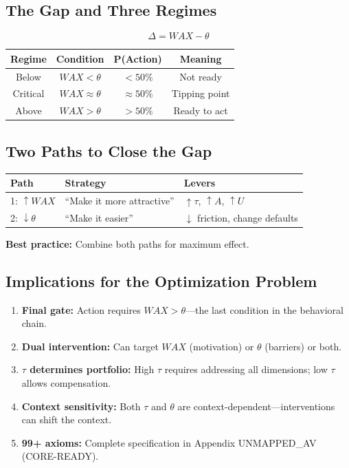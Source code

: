 \subsection{The Gap and Three Regimes}

\begin{equation}
\boxed{
\Delta = WAX - \theta
}
\label{eq:mp-gap}
\end{equation}

\begin{center}
\renewcommand{\arraystretch}{1.2}
\begin{tabular}{@{}cccc@{}}
\toprule
\textbf{Regime} & \textbf{Condition} & \textbf{P(Action)} & \textbf{Meaning} \\
\midrule
Below & $WAX < \theta$ & $< 50\%$ & Not ready \\
Critical & $WAX \approx \theta$ & $\approx 50\%$ & Tipping point \\
Above & $WAX > \theta$ & $> 50\%$ & Ready to act \\
\bottomrule
\end{tabular}
\end{center}

\subsection{Two Paths to Close the Gap}

\begin{center}
\renewcommand{\arraystretch}{1.2}
\begin{tabular}{@{}lll@{}}
\toprule
\textbf{Path} & \textbf{Strategy} & \textbf{Levers} \\
\midrule
1: $\uparrow WAX$ & ``Make it more attractive'' & $\uparrow \tau$, $\uparrow A$, $\uparrow U$ \\
2: $\downarrow \theta$ & ``Make it easier'' & $\downarrow$ friction, change defaults \\
\bottomrule
\end{tabular}
\end{center}

\textbf{Best practice:} Combine both paths for maximum effect.

\subsection{Implications for the Optimization Problem}

\begin{enumerate}[nosep]
\item \textbf{Final gate:} Action requires $WAX > \theta$---the last condition in the behavioral chain.
\item \textbf{Dual intervention:} Can target $WAX$ (motivation) or $\theta$ (barriers) or both.
\item \textbf{$\tau$ determines portfolio:} High $\tau$ requires addressing all dimensions; low $\tau$ allows compensation.
\item \textbf{Context sensitivity:} Both $\tau$ and $\theta$ are context-dependent---interventions can shift the context.
\item \textbf{99+ axioms:} Complete specification in Appendix UNMAPPED_AV (CORE-READY).
\end{enumerate}

